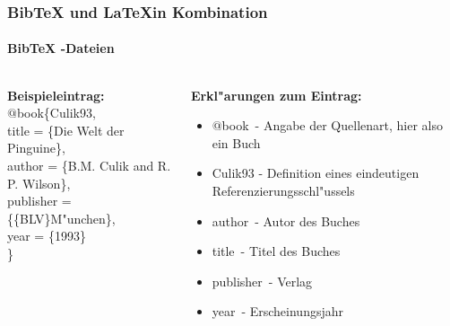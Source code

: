 
\begin{frame}
\frametitle{BibTeX und \LaTeX in Kombination}
\framesubtitle{BibTeX -Dateien}
\begin{columns}
\hspace*{5mm}
\begin{column}{0.45\textwidth}
\textbf{Beispieleintrag:}\\[1em]

\color{nounibaredI}$@$book\color{black}\{Culik93,\\
\color{nounibaredI}title\color{black} = \{Die Welt der Pinguine\},\\
\color{nounibaredI}author\color{black} = \{B.M. Culik and R. P. Wilson\},\\
\color{nounibaredI}publisher\color{black} = \{\{BLV\}M"unchen\},\\
\color{nounibaredI}year\color{black} = \{1993\}\\
\}
\end{column}
\begin{column}{0.55\textwidth}
\textbf{Erkl"arungen zum Eintrag:}
\begin{itemize}
\item \color{nounibaredI}$@$book\color{black}~- Angabe der Quellenart, hier also ein Buch
\item Culik93 - Definition eines eindeutigen Referenzierungsschl"ussels
\item \color{nounibaredI}author\color{black}~- Autor des Buches
\item \color{nounibaredI}title\color{black}~- Titel des Buches
\item \color{nounibaredI}publisher\color{black}~- Verlag
\item \color{nounibaredI}year\color{black}~- Erscheinungsjahr
\end{itemize}
\end{column}
\end{columns}

\end{frame}


